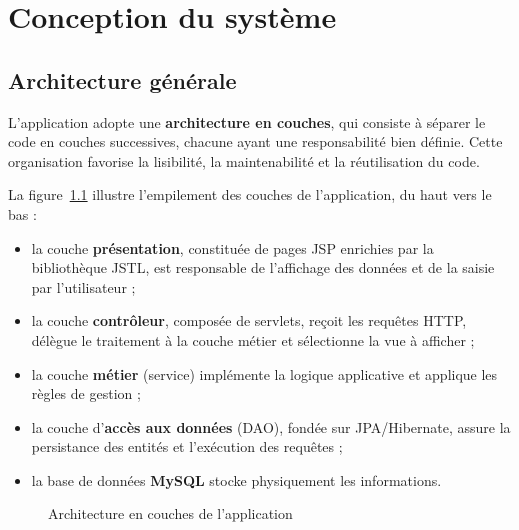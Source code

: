 \chapter{Conception du système}

\section{Architecture générale}

L'application adopte une \textbf{architecture en couches}, qui consiste à séparer le code en couches successives, chacune ayant une responsabilité bien définie. Cette organisation favorise la lisibilité, la maintenabilité et la réutilisation du code.

La figure~\ref{fig:architecture} illustre l'empilement des couches de l'application, du haut vers le bas :

\begin{itemize}
    \item la couche \textbf{présentation}, constituée de pages JSP enrichies par la bibliothèque JSTL, est responsable de l'affichage des données et de la saisie par l'utilisateur ;
    \item la couche \textbf{contrôleur}, composée de servlets, reçoit les requêtes HTTP, délègue le traitement à la couche métier et sélectionne la vue à afficher ;
    \item la couche \textbf{métier} (service) implémente la logique applicative et applique les règles de gestion ;
    \item la couche d'\textbf{accès aux données} (DAO), fondée sur JPA/Hibernate, assure la persistance des entités et l'exécution des requêtes ;
    \item la base de données \textbf{MySQL} stocke physiquement les informations.
\end{itemize}

\begin{figure}[H]
\centering
{}
\caption{Architecture en couches de l'application}
\label{fig:architecture}
\end{figure}

